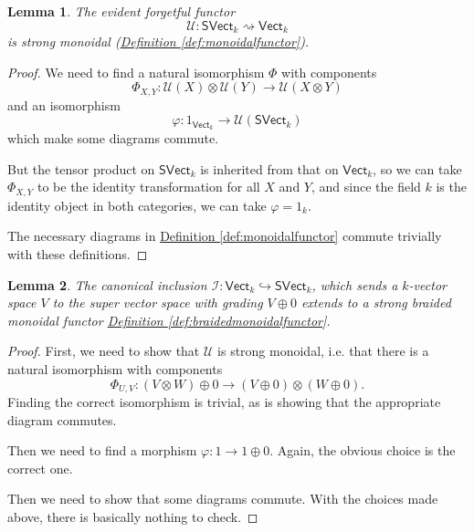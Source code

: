 \documentclass[a4paper]{report}
\theoremstyle{definition}
\theoremstyle{plain}
\newtheorem{lemma}{Lemma}[section]
\theoremstyle{remark}
\begin{document}
\begin{lemma}
  The evident forgetful functor 
  \begin{equation*}
    \mathcal{U}\colon \mathsf{SVect}_{k} \rightsquigarrow \mathsf{Vect}_{k}
  \end{equation*}
  is strong monoidal (\hyperref[def:monoidalfunctor]{Definition \ref*{def:monoidalfunctor}}).
\end{lemma}
\begin{proof}
  We need to find a natural isomorphism $\Phi$ with components 
  \begin{equation*}
    \Phi_{X, Y}\colon \mathcal{U}(X) \otimes \mathcal{U}(Y) \to \mathcal{U}(X \otimes Y)
  \end{equation*}
  and an isomorphism
  \begin{equation*}
    \varphi\colon 1_{\mathsf{Vect}_{k}} \to \mathcal{U}(\mathsf{SVect}_{k})
  \end{equation*}
  which make some diagrams commute.

  But the tensor product on $\mathsf{SVect}_{k}$ is inherited from that on $\mathsf{Vect}_{k}$, so we can take $\Phi_{X, Y}$ to be the identity transformation for all $X$ and $Y$, and since the field $k$ is the identity object in both categories, we can take $\varphi = 1_{k}$.

  The necessary diagrams in \hyperref[def:monoidalfunctor]{Definition \ref*{def:monoidalfunctor}} commute trivially with these definitions.
\end{proof} 

\begin{lemma}
  \label{lemma:monoidalinclusionofvectorspacesintosupervectorspaces}
  The canonical inclusion $\mathcal{I}\colon \mathsf{Vect}_{k} \hookrightarrow \mathsf{SVect}_{k}$, which sends a $k$-vector space $V$ to the super vector space with grading $V \oplus 0$ extends to a strong braided monoidal functor \hyperref[def:braidedmonoidalfunctor]{Definition \ref*{def:braidedmonoidalfunctor}}.
\end{lemma}
\begin{proof}
  First, we need to show that $\mathcal{U}$ is strong monoidal, i.e. that there is a natural isomorphism with components
  \begin{equation*}
    \Phi_{U,V}\colon (V \otimes W) \oplus 0 \to (V \oplus 0) \otimes (W \oplus 0).
  \end{equation*}
  Finding the correct isomorphism is trivial, as is showing that the appropriate diagram commutes.

  Then we need to find a morphism $\varphi\colon 1 \to 1 \oplus 0$. Again, the obvious choice is the correct one.

  Then we need to show that some diagrams commute. With the choices made above, there is basically nothing to check.
\end{proof}
\end{document}

